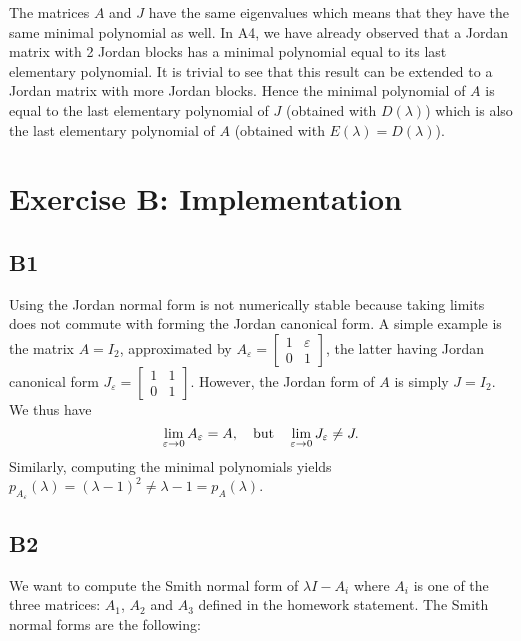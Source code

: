 \documentclass[11pt]{article}
\begin{document}
The matrices $A$ and $J$ have the same eigenvalues which means that they have the same minimal polynomial as well. In A4, we have already observed that a Jordan matrix with 2 Jordan blocks has a minimal polynomial equal to its last elementary polynomial. It is trivial to see that this result can be extended to a Jordan matrix with more Jordan blocks. Hence the minimal polynomial of $A$ is equal to the last elementary polynomial of $J$ (obtained with $D(\lambda)$) which is also the last elementary polynomial of $A$ (obtained with $E(\lambda) = D(\lambda)$). 
\section*{Exercise B: Implementation}
\subsection*{B1}
Using the Jordan normal form is not numerically stable because taking limits does not commute with forming the Jordan canonical form.
A simple example is the matrix \(A = I_2\), approximated by \(A_\varepsilon = \left[\begin{smallmatrix} 1 & \varepsilon \\ 0 & 1\end{smallmatrix}\right]\), the latter having Jordan canonical form \(J_\varepsilon = \left[\begin{smallmatrix} 1 & 1 \\ 0 & 1\end{smallmatrix}\right]\).
However, the Jordan form of \(A\) is simply \(J = I_2\).
We thus have
\[
\lim_{\varepsilon \to 0} A_\varepsilon = A, \quad \textnormal{but} \quad \lim_{\varepsilon \to 0} J_\varepsilon \neq J.
\]
Similarly, computing the minimal polynomials yields \(p_{A_\varepsilon}(\lambda) = (\lambda - 1)^2 \ne \lambda - 1 = p_A(\lambda)\).

\subsection*{B2}
We want to compute the Smith normal form of $\lambda I - A_{i}$ where $A_{i}$ is one of the three matrices: $A_1$, $A_2$ and $A_3$ defined in the homework statement. The Smith normal forms are the following:
\end{document}
